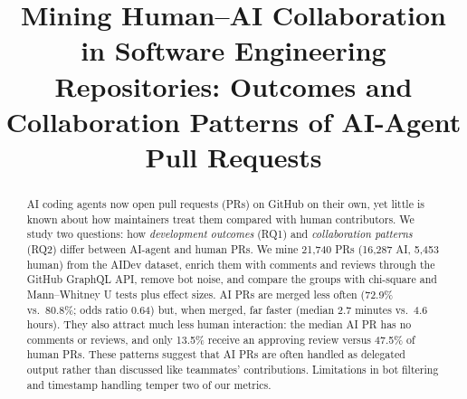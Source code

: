 \documentclass[conference]{IEEEtran}
\begin{document}
\title{Mining Human--AI Collaboration in Software Engineering Repositories: Outcomes and Collaboration Patterns of AI-Agent Pull Requests}

\author{
\and
{}
\and
{}
\and
{}
}

\maketitle

\begin{abstract}
AI coding agents now open pull requests (PRs) on GitHub on their own, yet little is known about how maintainers treat them compared with human contributors. We study two questions: how \emph{development outcomes} (RQ1) and \emph{collaboration patterns} (RQ2) differ between AI-agent and human PRs. We mine 21{,}740 PRs (16{,}287 AI, 5{,}453 human) from the AIDev dataset, enrich them with comments and reviews through the GitHub GraphQL API, remove bot noise, and compare the groups with chi-square and Mann--Whitney U tests plus effect sizes. AI PRs are merged less often (72.9\% vs.\ 80.8\%; odds ratio 0.64) but, when merged, far faster (median 2.7 minutes vs.\ 4.6 hours). They also attract much less human interaction: the median AI PR has no comments or reviews, and only 13.5\% receive an approving review versus 47.5\% of human PRs. These patterns suggest that AI PRs are often handled as delegated output rather than discussed like teammates' contributions. Limitations in bot filtering and timestamp handling temper two of our metrics.
\end{abstract}
\end{document}
